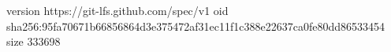 version https://git-lfs.github.com/spec/v1
oid sha256:95fa70671b66856864d3e375472af31ec11f1c388e22637ca0fe80dd86533454
size 333698
